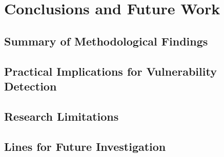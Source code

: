 \section{Conclusions and Future Work}
    \subsection{Summary of Methodological Findings}
    \subsection{Practical Implications for Vulnerability Detection}
    \subsection{Research Limitations}
    \subsection{Lines for Future Investigation}